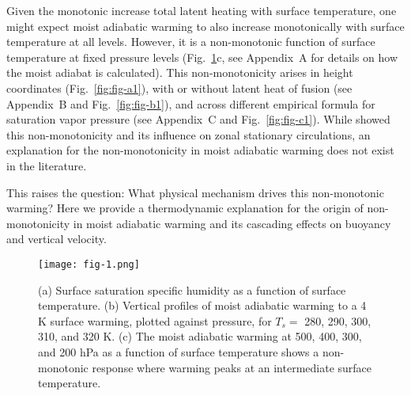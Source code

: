 \documentclass[draft]{ametsocV6.1}
\begin{document}
Given the monotonic increase total latent heating with surface temperature, one might expect moist adiabatic warming to also increase monotonically with surface temperature at all levels. However, it is a non-monotonic function of surface temperature at fixed pressure levels (Fig.~\ref{fig:fig-1}c, see Appendix~A for details on how the moist adiabat is calculated). This non-monotonicity arises in height coordinates (Fig.~\ref{fig:fig-a1}), with or without latent heat of fusion (see Appendix~B and Fig.~\ref{fig:fig-b1}), and across different empirical formula for saturation vapor pressure (see Appendix~C and Fig.~\ref{fig:fig-c1}). While \citet{levine2016} showed this non-monotonicity and its influence on zonal stationary circulations, an explanation for the non-monotonicity in moist adiabatic warming does not exist in the literature.

This raises the question: What physical mechanism drives this non-monotonic warming? Here we provide a thermodynamic explanation for the origin of non-monotonicity in moist adiabatic warming and its cascading effects on buoyancy and vertical velocity.

\begin{figure}[htbp]
 \centering
 \texttt{[image: fig-1.png]}\\
\caption{(a) Surface saturation specific humidity as a function of surface temperature. (b) Vertical profiles of moist adiabatic warming to a 4 K surface warming, plotted against pressure, for $T_s = $ 280, 290, 300, 310, and 320 K. (c) The moist adiabatic warming at 500, 400, 300, and 200 hPa as a function of surface temperature shows a non-monotonic response where warming peaks at an intermediate surface temperature.}
\label{fig:fig-1}
\end{figure}
\end{document}
